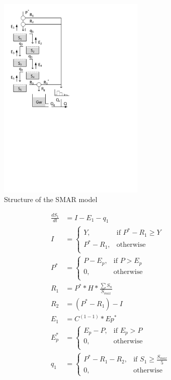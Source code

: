 { 																	%
\begin{figure}
\includegraphics[trim=1cm 13cm 7cm 1cm,width=7cm,keepaspectratio]{./files/40_schematic.pdf}
\caption{Structure of the SMAR model} \label{fig:40_schematic}
\end{figure}

\begin{align}
	\frac{dS_1}{dt} &= I-E_1-q_1 \\
	I &= \begin{cases}
		Y, &\text{if } P^*-R_1 \geq Y \\
		P^*-R_1, & \text{otherwise} \\
		\end{cases}\\
	P^* &= \begin{cases}
		P-E_p, &\text{if } P > E_p \\
		0, & \text{otherwise} \\
	\end{cases} \\
	R_1 &= P^**H*\frac{\sum{S_n}}{S_{max}}\\
	R_2 &= \left(P^*-R_1\right) - I\\
	E_1 &= C^{(1-1)}*Ep^* \\
	E_p^* &= \begin{cases}
		E_p-P, &\text{if } E_p > P \\
		0, & \text{otherwise} \\
	\end{cases} \\
	q_1 &= 
	\begin{cases}
		P^*-R_1-R_2, & \text{if } S_1 \geq \frac{S_{max}}{5} \\
		0, & \text{otherwise}
	\end{cases}
\end{align}

} %


